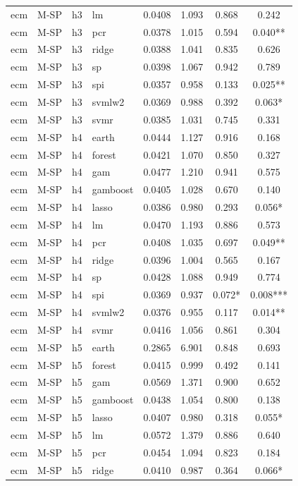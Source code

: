\begin{ThreePartTable}
\begin{longtable}[t]{llclcccc}
ecm & M-SP & h3 & lm & 0.0408 & 1.093 & 0.868 & 0.242\\
ecm & M-SP & h3 & pcr & 0.0378 & 1.015 & 0.594 & 0.040**\\
ecm & M-SP & h3 & ridge & 0.0388 & 1.041 & 0.835 & 0.626\\
ecm & M-SP & h3 & sp & 0.0398 & 1.067 & 0.942 & 0.789\\
ecm & M-SP & h3 & spi & 0.0357 & 0.958 & 0.133 & 0.025**\\
ecm & M-SP & h3 & svmlw2 & 0.0369 & 0.988 & 0.392 & 0.063*\\
ecm & M-SP & h3 & svmr & 0.0385 & 1.031 & 0.745 & 0.331\\
\addlinespace
ecm & M-SP & h4 & earth & 0.0444 & 1.127 & 0.916 & 0.168\\
ecm & M-SP & h4 & forest & 0.0421 & 1.070 & 0.850 & 0.327\\
ecm & M-SP & h4 & gam & 0.0477 & 1.210 & 0.941 & 0.575\\
ecm & M-SP & h4 & gamboost & 0.0405 & 1.028 & 0.670 & 0.140\\
ecm & M-SP & h4 & lasso & 0.0386 & 0.980 & 0.293 & 0.056*\\
ecm & M-SP & h4 & lm & 0.0470 & 1.193 & 0.886 & 0.573\\
ecm & M-SP & h4 & pcr & 0.0408 & 1.035 & 0.697 & 0.049**\\
ecm & M-SP & h4 & ridge & 0.0396 & 1.004 & 0.565 & 0.167\\
ecm & M-SP & h4 & sp & 0.0428 & 1.088 & 0.949 & 0.774\\
ecm & M-SP & h4 & spi & 0.0369 & 0.937 & 0.072* & 0.008***\\
ecm & M-SP & h4 & svmlw2 & 0.0376 & 0.955 & 0.117 & 0.014**\\
ecm & M-SP & h4 & svmr & 0.0416 & 1.056 & 0.861 & 0.304\\
\addlinespace
ecm & M-SP & h5 & earth & 0.2865 & 6.901 & 0.848 & 0.693\\
ecm & M-SP & h5 & forest & 0.0415 & 0.999 & 0.492 & 0.141\\
ecm & M-SP & h5 & gam & 0.0569 & 1.371 & 0.900 & 0.652\\
ecm & M-SP & h5 & gamboost & 0.0438 & 1.054 & 0.800 & 0.138\\
ecm & M-SP & h5 & lasso & 0.0407 & 0.980 & 0.318 & 0.055*\\
ecm & M-SP & h5 & lm & 0.0572 & 1.379 & 0.886 & 0.640\\
ecm & M-SP & h5 & pcr & 0.0454 & 1.094 & 0.823 & 0.184\\
ecm & M-SP & h5 & ridge & 0.0410 & 0.987 & 0.364 & 0.066*\\

\end{longtable}
\end{ThreePartTable}
